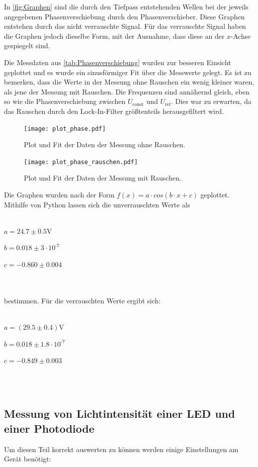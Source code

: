 In \autoref{fig:Graphen} sind die durch den Tiefpass entstehenden Wellen bei der jeweils angegebenen Phasenverschiebung durch den Phasenverschieber. Diese Graphen entstehen durch das nicht verrauschte Signal.
Für das verrauschte Signal haben die Graphen jedoch dieselbe Form, mit der Ausnahme, dass diese an der $x$-Achse gespiegelt sind.

Die Messdaten aus \autoref{tab:Phasenverschiebung} wurden zur besseren Einsicht geplottet und es wurde ein sinusförmiger Fit über die Messwerte gelegt.
Es ist zu bemerken, dass die Werte in der Messung ohne Rauschen ein wenig kleiner waren, als jene der Messung mit Rauschen.
Die Frequenzen sind annähernd gleich, eben so wie die Phasenverschiebung zwischen $U_\text{const}$ und $U_\text{ref}$. Dies war zu erwarten, da das Rauschen durch den Lock-In-Filter größtenteils herausgefiltert wird.

\begin{figure}
  \centering
  \texttt{[image: plot\_phase.pdf]}
  \caption{Plot und Fit der Daten der Messung ohne Rauschen.}
  \label{fig:plot_phase}
\end{figure}

\begin{figure}
  \centering
  \texttt{[image: plot\_phase\_rauschen.pdf]}
  \caption{Plot und Fit der Daten der Messung mit Rauschen.}
  \label{fig:plot_phase_rauschen}
\end{figure}

Die Graphen wurden nach der Form $f(x)=a\cdot cos(b\cdot x+c)$ geplottet. Mithilfe von Python lassen sich die unverrauschten Werte als
\\ \\
\centerline{$a=24.7 \pm 0.5$V}
\centerline{$b=0.018 \pm 3\cdot 10^\text{-7}$}
\centerline{$c=-0.860 \pm 0.004$}
\\ \\
bestimmen. Für die verrauschten Werte ergibt sich:
\\ \\
\centerline{$a=(29.5 \pm 0.4)$V}
\centerline{$b=0.018 \pm 1.8\cdot 10^\text{-7}$}
\centerline{$c=-0.849 \pm 0.003$}
\\ \\
\pagebreak
\subsection{Messung von Lichtintensität einer LED und einer Photodiode}

Um diesen Teil korrekt auswerten zu können werden einige Einstellungen am Gerät benötigt:

